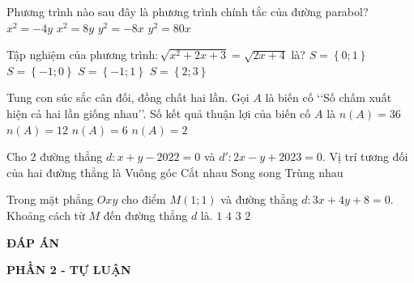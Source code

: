 \begin{ex}%
	Phương trình nào sau đây là phương trình chính tắc của đường parabol?
	\choice
	{$x^2=-4y$}
	{$x^2=8y$}
	{$y^2=-8x$}
	{\True $y^2=80x$}
\end{ex}
\begin{ex}%
	Tập nghiệm của phương trình$\colon \sqrt{x^2+2x+3}=\sqrt{2x+4}$ là?
	\choice
	{$S=\left\lbrace 0;1\right\rbrace $}
	{$S=\left\lbrace -1;0\right\rbrace $}
	{\True $S=\left\lbrace -1;1\right\rbrace $}
	{$S=\left\lbrace 2;3\right\rbrace $}
\end{ex}
\begin{ex}%
	Tung con súc sắc cân đối, đồng chất hai lần. Gọi $A$ là biến cố \lq\lq Số chấm xuất hiện cả hai lần giống nhau\rq\rq. Số kết quả thuận lợi của biến cố $A$ là
	\choice
	{$n(A)=36$}
	{$n(A)=12$}
	{\True $n(A)=6$}
	{$n(A)=2$}
\end{ex}
\begin{ex}%
	Cho $2$ đường thẳng $d\colon x + y -2022=0$ và $d'\colon 2x - y + 2023=0$. Vị trí tương đối của hai đường thẳng là
	\choice
	{Vuông góc}
	{\True Cắt nhau}
	{Song song}
	{Trùng nhau}
\end{ex}
\begin{ex}%
	Trong mặt phẳng $Oxy$ cho điểm $M(1;1)$ và đường thẳng $d\colon 3x + 4y +8=0$. Khoảng cách từ $M$ đến
	đường thẳng $d$ là.
	\choice
	{$1$}
	{$4$}
	{\True $3$}
	{$2$}
\end{ex}

\begin{center}
	\textbf{ĐÁP ÁN}
\end{center}
\begin{center}
	\textbf{PHẦN 2 - TỰ LUẬN}
\end{center}

